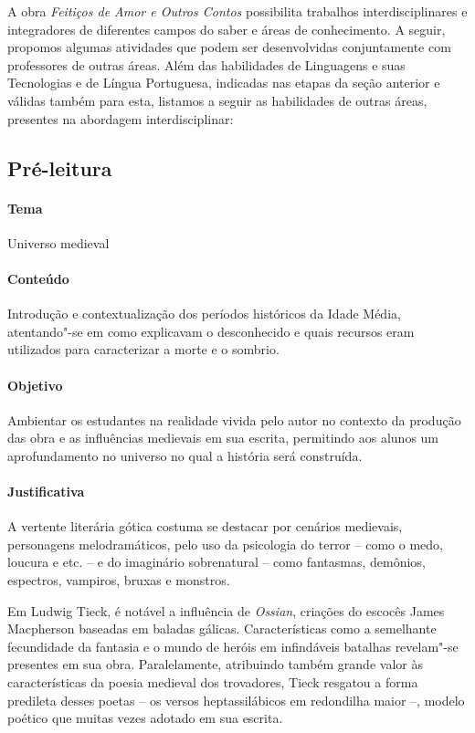 \documentclass[12pt]{extarticle}
\begin{document}
A obra \emph{Feitiços de Amor e Outros Contos} possibilita trabalhos
interdisciplinares e integradores de diferentes campos do saber e áreas
de conhecimento. A seguir, propomos algumas atividades que podem ser
desenvolvidas conjuntamente com professores de outras áreas. Além das
habilidades de Linguagens e suas Tecnologias e de Língua Portuguesa,
indicadas nas etapas da seção anterior e válidas também para esta,
listamos a seguir as habilidades de outras áreas, presentes na abordagem
interdisciplinar:

\subsection{Pré-leitura}

\paragraph{Tema} Universo medieval 

\paragraph{Conteúdo} Introdução e contextualização dos períodos históricos
da Idade Média, atentando"-se em como explicavam o desconhecido e quais recursos 
eram utilizados para caracterizar a morte e o sombrio. 

\paragraph{Objetivo} Ambientar os estudantes na realidade vivida pelo autor no contexto 
da produção das obra e as influências medievais em sua escrita, permitindo aos alunos um 
aprofundamento no universo no qual a história será construída.

\paragraph{Justificativa} A vertente literária gótica costuma se destacar por cenários medievais,
personagens melodramáticos, pelo uso da psicologia do terror -- como o medo,
loucura e etc. -- e do imaginário sobrenatural -- como fantasmas,
demônios, espectros, vampiros, bruxas e monstros.

Em Ludwig Tieck, é notável a influência de \textit{Ossian}, criações do escocês James Macpherson 
baseadas em baladas gálicas. Características como a semelhante fecundidade da fantasia e o mundo 
de heróis em infindáveis batalhas revelam"-se presentes em sua obra. Paralelamente, atribuindo 
também grande valor às características da poesia medieval dos trovadores,
Tieck resgatou a forma predileta desses poetas -- os
versos heptassilábicos em redondilha maior --, modelo poético
que muitas vezes adotado em sua escrita.
\end{document}
